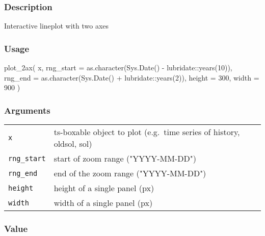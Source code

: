 \documentclass[
  letterpaper,
  DIV=11,
  numbers=noendperiod]{scrreport}
\newenvironment{Shaded}{\begin{snugshade}}{\end{snugshade}}
\newcommand{\AttributeTok}[1]{\textcolor[rgb]{0.40,0.45,0.13}{#1}}
\newcommand{\DecValTok}[1]{\textcolor[rgb]{0.68,0.00,0.00}{#1}}
\newcommand{\FunctionTok}[1]{\textcolor[rgb]{0.28,0.35,0.67}{#1}}
\newcommand{\NormalTok}[1]{\textcolor[rgb]{0.00,0.23,0.31}{#1}}
\newcommand{\SpecialCharTok}[1]{\textcolor[rgb]{0.37,0.37,0.37}{#1}}
\begin{document}
\subsubsection{Description}\label{description-64}

Interactive lineplot with two axes

\subsubsection{Usage}\label{usage-64}

\begin{Shaded}
\begin{Highlighting}[]
\FunctionTok{plot\_2ax}\NormalTok{(}
\NormalTok{  x,}
  \AttributeTok{rng\_start =} \FunctionTok{as.character}\NormalTok{(}\FunctionTok{Sys.Date}\NormalTok{() }\SpecialCharTok{{-}}\NormalTok{ lubridate}\SpecialCharTok{::}\FunctionTok{years}\NormalTok{(}\DecValTok{10}\NormalTok{)),}
  \AttributeTok{rng\_end =} \FunctionTok{as.character}\NormalTok{(}\FunctionTok{Sys.Date}\NormalTok{() }\SpecialCharTok{+}\NormalTok{ lubridate}\SpecialCharTok{::}\FunctionTok{years}\NormalTok{(}\DecValTok{2}\NormalTok{)),}
  \AttributeTok{height =} \DecValTok{300}\NormalTok{,}
  \AttributeTok{width =} \DecValTok{900}
\NormalTok{)}
\end{Highlighting}
\end{Shaded}

\subsubsection{Arguments}\label{arguments-64}

\begin{longtable}[]{@{}ll@{}}
\toprule\noalign{}
\endhead
\bottomrule\noalign{}
\endlastfoot
\texttt{x} & ts-boxable object to plot (e.g.~time series of history,
oldsol, sol) \\
\texttt{rng\_start} & start of zoom range ("YYYY-MM-DD") \\
\texttt{rng\_end} & end of the zoom range ("YYYY-MM-DD") \\
\texttt{height} & height of a single panel (px) \\
\texttt{width} & width of a single panel (px) \\
\end{longtable}

\subsubsection{Value}\label{value-62}
\end{document}
